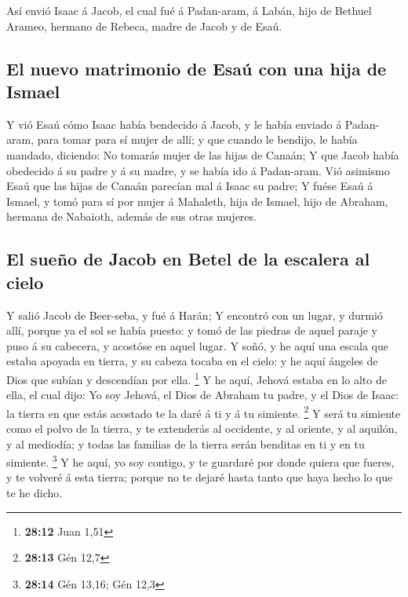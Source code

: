  Así envió Isaac á Jacob, el cual fué á Padan-aram, á Labán,
hijo de Bethuel Arameo, hermano de Rebeca, madre de Jacob y de Esaú.

\hypertarget{el-nuevo-matrimonio-de-esauxfa-con-una-hija-de-ismael}{%
\subsection{El nuevo matrimonio de Esaú con una hija de
Ismael}\label{el-nuevo-matrimonio-de-esauxfa-con-una-hija-de-ismael}}

 Y vió Esaú cómo Isaac había bendecido á Jacob, y le había
enviado á Padan-aram, para tomar para sí mujer de allí; y que cuando le
bendijo, le había mandado, diciendo: No tomarás mujer de las hijas de
Canaán;  Y que Jacob había obedecido á su padre y á su
madre, y se había ido á Padan-aram.  Vió asimismo Esaú que
las hijas de Canaán parecían mal á Isaac su padre;  Y fuése
Esaú á Ismael, y tomó para sí por mujer á Mahaleth, hija de Ismael, hijo
de Abraham, hermana de Nabaioth, además de sus otras mujeres.

\hypertarget{el-sueuxf1o-de-jacob-en-betel-de-la-escalera-al-cielo}{%
\subsection{El sueño de Jacob en Betel de la escalera al
cielo}\label{el-sueuxf1o-de-jacob-en-betel-de-la-escalera-al-cielo}}

 Y salió Jacob de Beer-seba, y fué á Harán;  Y
encontró con un lugar, y durmió allí, porque ya el sol se había puesto:
y tomó de las piedras de aquel paraje y puso á su cabecera, y acostóse
en aquel lugar.  Y soñó, y he aquí una escala que estaba
apoyada en tierra, y su cabeza tocaba en el cielo: y he aquí ángeles de
Dios que subían y descendían por ella. \footnote{\textbf{28:12} Juan
  1,51}  Y he aquí, Jehová estaba en lo alto de ella, el
cual dijo: Yo soy Jehová, el Dios de Abraham tu padre, y el Dios de
Isaac: la tierra en que estás acostado te la daré á ti y á tu simiente.
\footnote{\textbf{28:13} Gén 12,7}  Y será tu simiente como
el polvo de la tierra, y te extenderás al occidente, y al oriente, y al
aquilón, y al mediodía; y todas las familias de la tierra serán benditas
en ti y en tu simiente. \footnote{\textbf{28:14} Gén 13,16; Gén 12,3}
 Y he aquí, yo soy contigo, y te guardaré por donde quiera
que fueres, y te volveré á esta tierra; porque no te dejaré hasta tanto
que haya hecho lo que te he dicho.

